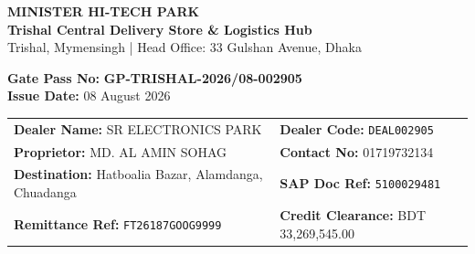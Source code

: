 \documentclass[11pt, a4paper]{article}
\begin{document}
\begin{tcolorbox}[colback=ministerred, colframe=ministerred, arc=4pt, left=12pt, right=12pt, top=10pt, bottom=10pt]
  \begin{minipage}{0.65\textwidth}
    {\color{white}\fontsize{18pt}{22pt}\selectfont \textbf{MINISTER HI-TECH PARK}} \\[3pt]
    {\color{white}\fontsize{11pt}{14pt}\selectfont \textbf{Trishal Central Delivery Store \& Logistics Hub}} \\[2pt]
    {\color{white}\small Trishal, Mymensingh | Head Office: 33 Gulshan Avenue, Dhaka}
  \end{minipage}%
  \begin{minipage}{0.34\textwidth}
    \raggedleft
    {\color{white}\small \textbf{Gate Pass No:}} {\color{goldaccent}\small \textbf{GP-TRISHAL-2026/08-002905}} \\[3pt]
    {\color{white}\small \textbf{Issue Date:}} {\color{white}\small 08 August 2026} \\[3pt]
  \end{minipage}
\end{tcolorbox}

\vspace{-4pt}

\begin{tcolorbox}[colback=lightgrey, colframe=bordergrey, title=\textbf{\color{darknavy}{1. DEALER \& DESTINATION DETAILS}}, fonttitle=\bfseries, arc=3pt, left=8pt, right=8pt, top=6pt, bottom=6pt]
  \renewcommand{\arraystretch}{1.3}
  \begin{tabularx}{\textwidth}{@{} X X @{}}
    \textbf{Dealer Name:} SR ELECTRONICS PARK & \textbf{Dealer Code:} \texttt{DEAL002905} \\
    \textbf{Proprietor:} MD. AL AMIN SOHAG & \textbf{Contact No:} 01719732134 \\
    \textbf{Destination:} Hatboalia Bazar, Alamdanga, Chuadanga & \textbf{SAP Doc Ref:} \texttt{5100029481} \\
    \textbf{Remittance Ref:} \texttt{FT26187GOOG9999} & \textbf{Credit Clearance:} BDT 33,269,545.00 \\
  \end{tabularx}
\end{tcolorbox}
\end{document}

